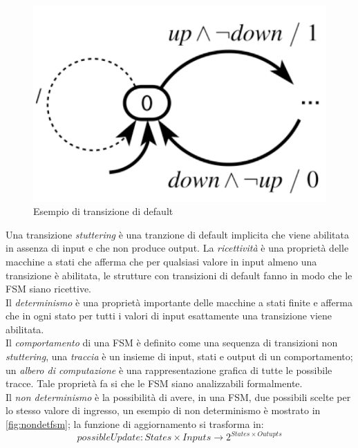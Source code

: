 \begin{figure}
\centering
\includegraphics[scale=0.4]{img/defaulttrans.png}
\caption{Esempio di transizione di default}\label{fig:defaulttrans}
\end{figure}
Una transizione \emph{stuttering} è una tranzione di default implicita che viene abilitata in assenza di input e che non produce output. La \emph{ricettività} è una proprietà delle macchine a stati che afferma che per qualsiasi valore in input almeno una transizione è abilitata, le strutture con transizioni di default fanno in modo che le FSM siano ricettive.\\
Il \emph{determinismo} è una proprietà importante delle macchine a stati finite e afferma che in ogni stato per tutti i valori di input esattamente una transizione viene abilitata.\\
Il \emph{comportamento} di una FSM è definito come una sequenza di transizioni non \emph{stuttering}, una \emph{traccia} è un insieme di input, stati e output di un comportamento; un \emph{albero di computazione} è una rappresentazione grafica di tutte le possibile tracce. Tale proprietà fa si che le FSM siano analizzabili formalmente.\\
Il \emph{non determinismo} è la possibilità di avere, in una FSM, due possibili scelte per lo stesso valore di ingresso, un esempio di non determinismo è  mostrato in \figurename\,\ref{fig:nondetfsm}; la funzione di aggiornamento si trasforma in:
$$possibleUpdate : States \times Inputs \rightarrow 2^{States \times Outupts}$$
